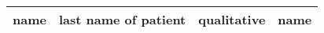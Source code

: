 \documentclass[a4paper,12pt]{article}
\begin{document}
\begin{adjustbox}{width=1\textwidth}
\begin{tabular}{|l|l|l|l|}
name          & last name of patient                                           & qualitative   & name                                                                                                                                                                                                                                                                                 \\ \hline
\end{tabular}

\end{adjustbox}
\end{document}

